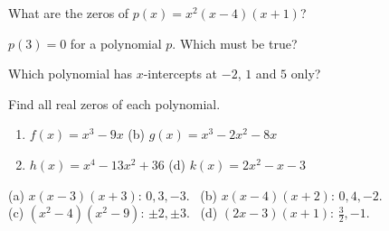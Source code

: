 \begin{exo}{}
What are the zeros of $p(x)=x^2(x-4)(x+1)$?
\end{exo}
\begin{exo}{}
$p(3)=0$ for a polynomial $p$. Which must be true?
\end{exo}
\begin{exo}{}
Which polynomial has $x$-intercepts at $-2$, $1$ and $5$ only?
\end{exo}
\begin{exo}{}
Find all real zeros of each polynomial.
\begin{enumerate}[label=(\alph*)]
\item $f(x)=x^3-9x$ \qquad (b) $g(x)=x^3-2x^2-8x$
\setcounter{enumi}{2}
\item $h(x)=x^4-13x^2+36$ \qquad (d) $k(x)=2x^2-x-3$
\end{enumerate}
\begin{solution}
(a) $x(x-3)(x+3)$: $0,3,-3$. \ (b) $x(x-4)(x+2)$: $0,4,-2$.\\
(c) $(x^2-4)(x^2-9)$: $\pm2,\pm3$. \ (d) $(2x-3)(x+1)$: $\frac32,-1$.
\end{solution}
\end{exo}

